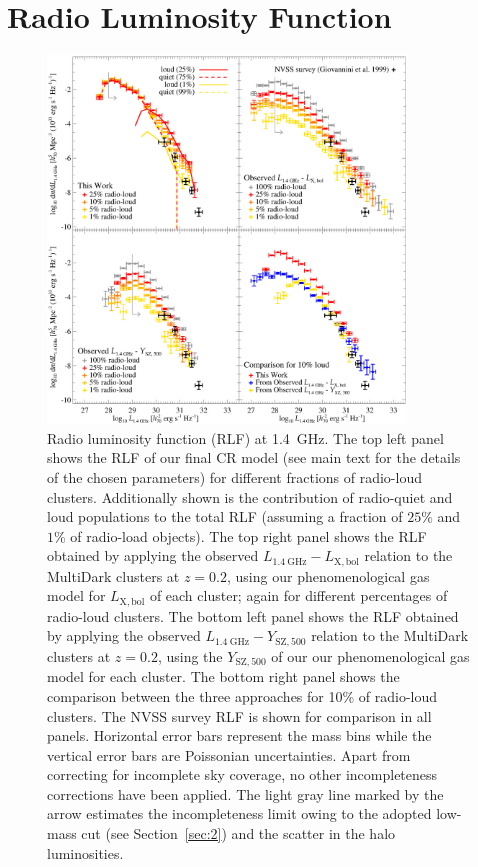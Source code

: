 \documentclass[traditabstract]{aa}
\newcommand{\rmn}{\mathrm}
\begin{document}
\section{Radio Luminosity Function}
\label{sec:5}

\begin{figure}[t]
\centering
\includegraphics[width=0.85\textwidth]{figures/RLFs_1.4.eps}
\caption{Radio luminosity function (RLF) at 1.4~GHz. The top left panel shows
  the RLF of our final CR model (see main text for the details of the chosen
  parameters) for different fractions of radio-loud clusters. Additionally shown
  is the contribution of radio-quiet and loud populations to the total RLF
  (assuming a fraction of $25\%$ and $1\%$ of radio-load objects). The top right
  panel shows the RLF obtained by applying the observed
  $L_{1.4~\rmn{GHz}}-L_{\rmn{X,bol}}$ relation to the MultiDark clusters at $z =
  0.2$, using our phenomenological gas model for $L_{\rmn{X,bol}}$ of each
  cluster; again for different percentages of radio-loud clusters.  The bottom
  left panel shows the RLF obtained by applying the observed
  $L_{1.4~\rmn{GHz}}-Y_{\rmn{SZ}, 500}$ relation to the MultiDark clusters at $z
  = 0.2$, using the $Y_{\rmn{SZ}, 500}$ of our our phenomenological gas model
  for each cluster. The bottom right panel shows the comparison between the
  three approaches for 10\% of radio-loud clusters. The NVSS survey RLF
  \citep{1999NewA....4..141G} is shown for comparison in all panels. Horizontal
  error bars represent the mass bins while the vertical error bars are
  Poissonian uncertainties. Apart from correcting for incomplete sky coverage,
  no other incompleteness corrections have been applied.  The light gray line
  marked by the arrow estimates the incompleteness limit owing to the adopted
  low-mass cut (see Section~\ref{sec:2}) and the scatter in the halo
  luminosities.}
\label{fig:RLF_1.4}
\end{figure}
\end{document}
